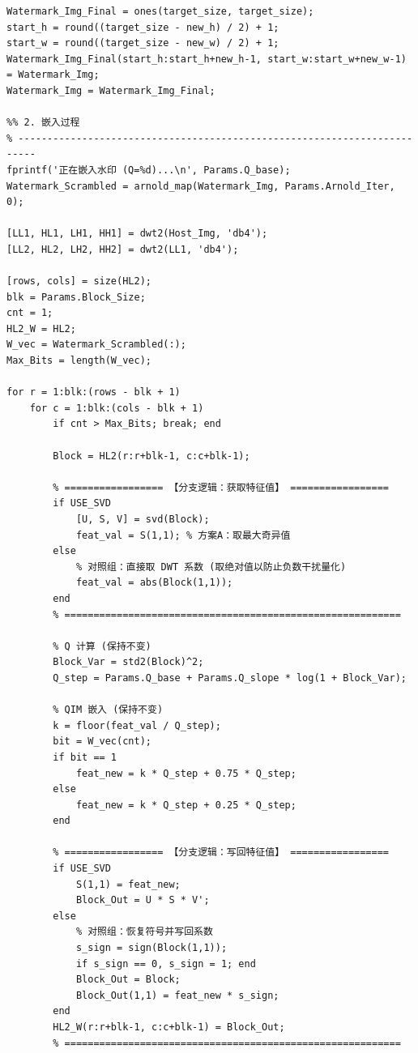 \documentclass[zihao=-4, a4paper]{ctexart} %
\begin{document}
\begin{lstlisting}[caption={DWT-SVD 水印嵌入与提取完整代码}]
% 创建64x64的白色背景，将水印居中放置
Watermark_Img_Final = ones(target_size, target_size);
start_h = round((target_size - new_h) / 2) + 1;
start_w = round((target_size - new_w) / 2) + 1;
Watermark_Img_Final(start_h:start_h+new_h-1, start_w:start_w+new_w-1) = Watermark_Img;
Watermark_Img = Watermark_Img_Final;

%% 2. 嵌入过程
% -------------------------------------------------------------------------
fprintf('正在嵌入水印 (Q=%d)...\n', Params.Q_base);
Watermark_Scrambled = arnold_map(Watermark_Img, Params.Arnold_Iter, 0);

[LL1, HL1, LH1, HH1] = dwt2(Host_Img, 'db4');
[LL2, HL2, LH2, HH2] = dwt2(LL1, 'db4');

[rows, cols] = size(HL2); 
blk = Params.Block_Size;
cnt = 1;
HL2_W = HL2; 
W_vec = Watermark_Scrambled(:);
Max_Bits = length(W_vec);

for r = 1:blk:(rows - blk + 1)
    for c = 1:blk:(cols - blk + 1)
        if cnt > Max_Bits; break; end
        
        Block = HL2(r:r+blk-1, c:c+blk-1);
        
        % ================= 【分支逻辑：获取特征值】 =================
        if USE_SVD
            [U, S, V] = svd(Block);
            feat_val = S(1,1); % 方案A：取最大奇异值
        else
            % 对照组：直接取 DWT 系数 (取绝对值以防止负数干扰量化)
            feat_val = abs(Block(1,1)); 
        end
        % ==========================================================
        
        % Q 计算 (保持不变)
        Block_Var = std2(Block)^2; 
        Q_step = Params.Q_base + Params.Q_slope * log(1 + Block_Var);
        
        % QIM 嵌入 (保持不变)
        k = floor(feat_val / Q_step);
        bit = W_vec(cnt);
        if bit == 1
            feat_new = k * Q_step + 0.75 * Q_step;
        else
            feat_new = k * Q_step + 0.25 * Q_step;
        end
        
        % ================= 【分支逻辑：写回特征值】 =================
        if USE_SVD
            S(1,1) = feat_new;
            Block_Out = U * S * V';
        else
            % 对照组：恢复符号并写回系数
            s_sign = sign(Block(1,1));
            if s_sign == 0, s_sign = 1; end
            Block_Out = Block;
            Block_Out(1,1) = feat_new * s_sign;
        end
        HL2_W(r:r+blk-1, c:c+blk-1) = Block_Out;
        % ==========================================================
        

\end{lstlisting}
\end{document}
